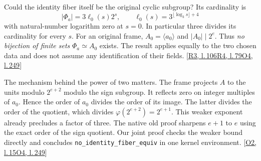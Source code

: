 \documentclass[12pt,letterpaper]{article}
\newcommand{\id}[1]{{\small\nolinkurl{#1}}}
\begin{document}
Could the identity fiber itself be the original cyclic subgroup? Its cardinality is
\[
            |\Phi_a|=3\ell_0(s)2^s,\qquad
            \ell_0(s)=3^{\lfloor\log_3 s\rfloor+4}
\]
with natural-number logarithm zero at $s=0$. In particular three divides its cardinality for every $s$. For an original frame, $A_0=\langle a_0\rangle$ and $|A_0|\mid 2^e$. Thus \emph{no bijection of finite sets} $\Phi_a\simeq A_0$ exists. The result applies equally to the two chosen data and does not assume any identification of their fields. {\footnotesize\sffamily\color{mute}[\href{https://github.com/leanprover-community/riemann-hypothesis/blob/e063a923620ee7787b4a1270421478645bf66bdb/src/New/Reduction/Data/FieldsAndPlaces.lean#L106}{R3, l.\,106}\enspace \href{https://github.com/leanprover-community/riemann-hypothesis/blob/e063a923620ee7787b4a1270421478645bf66bdb/src/New/Reduction/PrimeSums.lean#L79}{R4, l.\,79}\enspace \href{https://github.com/nousentllc/riemann-hypothesis/blob/40e56bab026552e089d7afcfeff08d2defb9c005/src/Formalism/SharpRestriction/RamificationFrobenius/TotientGaloisClasses/FrameFacts.lean#L249}{O4, l.\,249}]}

The mechanism behind the power of two matters. The frame projects $A$ to the units modulo $2^{e+2}$ modulo the sign subgroup. It reflects zero on integer multiples of $a_0$. Hence the order of $a_0$ divides the order of its image. The latter divides the order of the quotient, which divides $\varphi(2^{e+2})=2^{e+1}$. This weaker exponent already precludes a factor of three. The native old proof sharpens $e+1$ to $e$ using the exact order of the sign quotient. Our joint proof checks the weaker bound directly and concludes \id{no_identity_fiber_equiv} in one kernel environment. {\footnotesize\sffamily\color{mute}[\href{https://github.com/nousentllc/riemann-hypothesis/blob/40e56bab026552e089d7afcfeff08d2defb9c005/src/Formalism/SharpRestriction/RamificationFrobenius/TotientGaloisClasses/ZsmulGeneratorEqZeroOfProjection.lean#L15}{O2, l.\,15}\enspace \href{https://github.com/nousentllc/riemann-hypothesis/blob/40e56bab026552e089d7afcfeff08d2defb9c005/src/Formalism/SharpRestriction/RamificationFrobenius/TotientGaloisClasses/FrameFacts.lean#L249}{O4, l.\,249}]}
\end{document}
